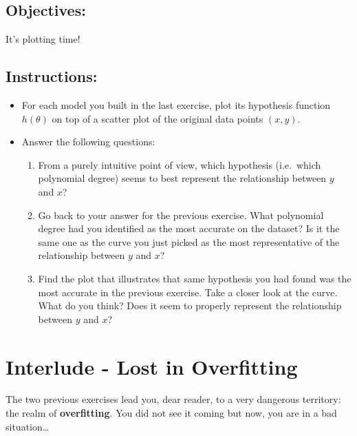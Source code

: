 \documentclass[]{article}
\begin{document}
\hypertarget{objectives-9}{%
\subsection{Objectives:}\label{objectives-9}}

It's plotting time!

\hypertarget{instructions-12}{%
\subsection{Instructions:}\label{instructions-12}}

\begin{itemize}
\item
  For each model you built in the last exercise, plot its hypothesis
  function \(h(\theta)\) on top of a scatter plot of the original data
  points \((x,y)\).
\item
  Answer the following questions:

  \begin{enumerate}
  \def\labelenumi{\arabic{enumi}.}
  \item
    From a purely intuitive point of view, which hypothesis (i.e.~which
    polynomial degree) seems to best represent the relationship between
    \(y\) and \(x\)?
  \item
    Go back to your answer for the previous exercise. What polynomial
    degree had you identified as the most accurate on the dataset? Is it
    the same one as the curve you just picked as the most representative
    of the relationship between \(y\) and \(x\)?
  \item
    Find the plot that illustrates that same hypothesis you had found
    was the most accurate in the previous exercise. Take a closer look
    at the curve. What do you think? Does it seem to properly represent
    the relationship between \(y\) and \(x\)? \clearpage
  \end{enumerate}
\end{itemize}

\hypertarget{interlude---lost-in-overfitting-1}{%
\section{Interlude - Lost in
Overfitting}\label{interlude---lost-in-overfitting-1}}

The two previous exercises lead you, dear reader, to a very dangerous
territory: the realm of \textbf{overfitting}. You did not see it coming
but now, you are in a bad situation\ldots{}
\end{document}
